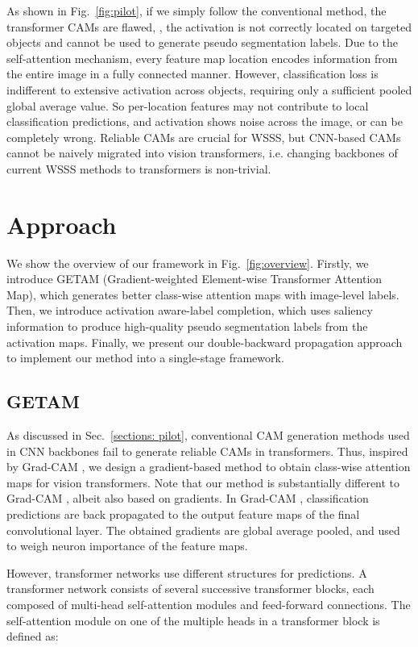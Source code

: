 \documentclass[10pt,twocolumn,letterpaper]{article}
\begin{document}
As shown in Fig.~\ref{fig:pilot}, if we simply follow the conventional method, the transformer CAMs are flawed, \ie, the activation is not correctly located on targeted objects and cannot be used to generate pseudo segmentation labels.
Due to the self-attention mechanism, every feature map location encodes information from the entire image in a fully connected manner. However, classification loss is indifferent to extensive activation across objects, requiring only a sufficient pooled global average value.
So per-location features may not contribute to local classification predictions, and activation shows noise across the image, or can be completely wrong.
Reliable CAMs are crucial for WSSS, but CNN-based CAMs cannot be naively migrated into vision transformers, i.e. changing backbones of current WSSS methods to transformers is non-trivial.


\section{Approach}
We show the overview of our framework in Fig.~\ref{fig:overview}.
Firstly, we introduce GETAM (Gradient-weighted Element-wise Transformer Attention Map), which generates better class-wise attention maps with image-level labels.
Then, we introduce activation aware-label completion, which uses saliency information to produce high-quality pseudo segmentation labels from the activation maps.
Finally, we present our double-backward propagation approach to implement our method into a single-stage framework.

\subsection{GETAM}
As discussed in Sec.~\ref{sections: pilot}, conventional CAM generation methods used in CNN backbones fail to generate reliable CAMs in transformers.
Thus, inspired by Grad-CAM \cite{selvaraju2017grad}, we design a gradient-based method to obtain class-wise attention maps for vision transformers.
Note that our method is substantially different to Grad-CAM \cite{selvaraju2017grad}, albeit also based on gradients.
In Grad-CAM \cite{selvaraju2017grad}, classification predictions are back propagated to the output feature maps of the final convolutional
layer.
The obtained gradients are global average pooled, and
used to weigh neuron 
importance of the feature maps.

However, transformer networks use different structures for predictions. 
A transformer network consists of several successive transformer blocks, each composed of multi-head self-attention modules and feed-forward connections.
The  self-attention module on one of the multiple heads in a transformer block is defined as:
\end{document}
